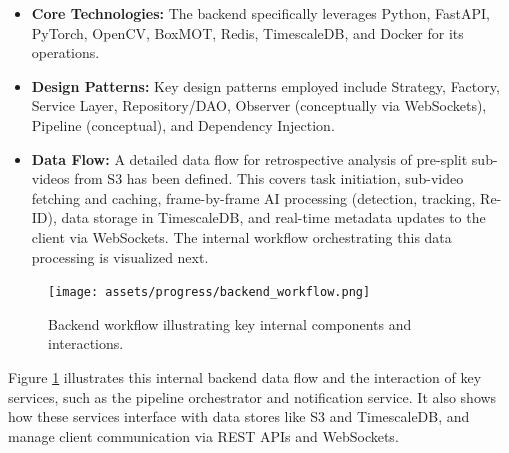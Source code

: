 \begin{itemize}
\begin{itemize}
    \item \textbf{Core Technologies:} The backend specifically leverages Python, FastAPI, PyTorch, OpenCV, BoxMOT, Redis, TimescaleDB, and Docker for its operations.
    \item \textbf{Design Patterns:} Key design patterns employed include Strategy, Factory, Service Layer, Repository/DAO, Observer (conceptually via WebSockets), Pipeline (conceptual), and Dependency Injection.
    \item \textbf{Data Flow:} A detailed data flow for retrospective analysis of pre-split sub-videos from S3 has been defined. This covers task initiation, sub-video fetching and caching, frame-by-frame AI processing (detection, tracking, Re-ID), data storage in TimescaleDB, and real-time metadata updates to the client via WebSockets. The internal workflow orchestrating this data processing is visualized next.
\end{itemize}

\begin{figure}[!htb]
    \centering
    \texttt{[image: assets/progress/backend\_workflow.png]}
    \caption{Backend workflow illustrating key internal components and interactions.}
    \label{fig:backend_workflow}
\end{figure}
Figure \ref{fig:backend_workflow} illustrates this internal backend data flow and the interaction of key services, such as the pipeline orchestrator and notification service. It also shows how these services interface with data stores like S3 and TimescaleDB, and manage client communication via REST APIs and WebSockets.

\clearpage 

\end{itemize}
